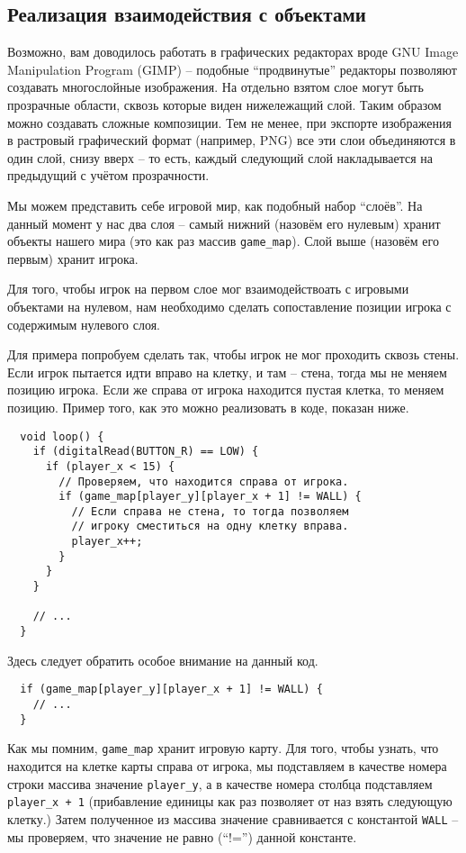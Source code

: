 \documentclass[../sparc.tex]{subfiles}
\begin{document}
\subsection{Реализация взаимодействия с объектами}

Возможно, вам доводилось работать в графических редакторах вроде GNU Image
Manipulation Program (GIMP) -- подобные ``продвинутые'' редакторы позволяют
создавать многослойные изображения.  На отдельно взятом слое могут быть
прозрачные области, сквозь которые виден нижележащий слой.  Таким образом можно
создавать сложные композиции.  Тем не менее, при экспорте изображения в
растровый графический формат (например, PNG) все эти слои объединяются в один
слой, снизу вверх -- то есть, каждый следующий слой накладывается на предыдущий
с учётом прозрачности.

Мы можем представить себе игровой мир, как подобный набор ``слоёв''.  На данный
момент у нас два слоя -- самый нижний (назовём его нулевым) хранит объекты
нашего мира (это как раз массив \texttt{game\_map}).  Слой выше (назовём его
первым) хранит игрока.

Для того, чтобы игрок на первом слое мог взаимодействоать с игровыми объектами
на нулевом, нам необходимо сделать сопоставление позиции игрока с содержимым
нулевого слоя.

Для примера попробуем сделать так, чтобы игрок не мог проходить сквозь стены.
Если игрок пытается идти вправо на клетку, и там -- стена, тогда мы не меняем
позицию игрока. Если же справа от игрока находится пустая клетка, то меняем
позицию.  Пример того, как это можно реализовать в коде, показан ниже.

\begin{verbatim}
  void loop() {
    if (digitalRead(BUTTON_R) == LOW) {
      if (player_x < 15) {
        // Проверяем, что находится справа от игрока.
        if (game_map[player_y][player_x + 1] != WALL) {
          // Если справа не стена, то тогда позволяем
          // игроку сместиться на одну клетку вправа.
          player_x++;
        }
      }
    }

    // ...
  }
\end{verbatim}

Здесь следует обратить особое внимание на данный код.

\begin{verbatim}
  if (game_map[player_y][player_x + 1] != WALL) {
    // ...
  }
\end{verbatim}

Как мы помним, \texttt{game\_map} хранит игровую карту.  Для того, чтобы узнать,
что находится на клетке карты справа от игрока, мы подставляем в качестве номера
строки массива значение \texttt{player\_y}, а в качестве номера столбца
подставляем \texttt{player\_x + 1} (прибавление единицы как раз позволяет от наз
взять следующую клетку.)  Затем полученное из массива значение сравнивается с
константой \texttt{WALL} -- мы проверяем, что значение не равно (``!='') данной
константе.
\end{document}
